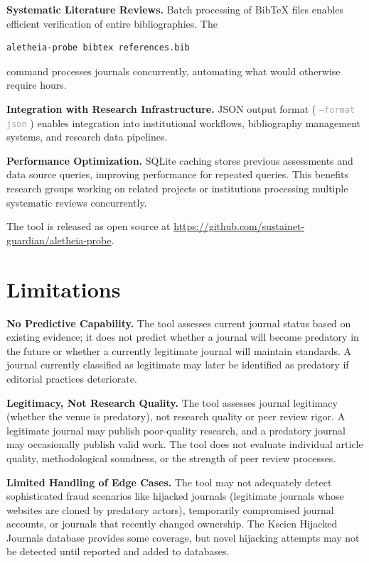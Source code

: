 \documentclass[fleqn,10pt]{SelfArx}
\newcommand{\ilcode}[1]{%
  \texttt{\small\textcolor{darkgray}{#1}}%
}
\begin{document}
\textbf{Systematic Literature Reviews.} Batch processing of BibTeX
files enables efficient verification of entire bibliographies. The
\begin{lstlisting}[language=bash,basicstyle=\ttfamily\scriptsize]
aletheia-probe bibtex references.bib
\end{lstlisting}
command processes journals concurrently, automating what
would otherwise require hours.

\textbf{Integration with Research Infrastructure.} JSON output format
(\ilcode{--format json}) enables integration into institutional
workflows, bibliography management systems, and research data
pipelines.

\textbf{Performance Optimization.} SQLite caching stores previous
assessments and data source queries, improving performance for repeated
queries. This benefits research groups working on related projects or
institutions processing multiple systematic reviews concurrently.

The tool is released as open source at
\url{https://github.com/sustainet-guardian/aletheia-probe}.

\section{Limitations}

\textbf{No Predictive Capability.} The tool assesses current journal
status based on existing evidence; it does not predict whether a
journal will become predatory in the future or whether a currently
legitimate journal will maintain standards. A journal currently
classified as legitimate may later be identified as predatory if
editorial practices deteriorate.

\textbf{Legitimacy, Not Research Quality.} The tool assesses journal
legitimacy (whether the venue is predatory), not research quality or
peer review rigor. A legitimate journal may publish poor-quality
research, and a predatory journal may occasionally publish valid work.
The tool does not evaluate individual article quality, methodological
soundness, or the strength of peer review processes.

\textbf{Limited Handling of Edge Cases.} The tool may not adequately
detect sophisticated fraud scenarios like hijacked journals (legitimate
journals whose websites are cloned by predatory actors), temporarily
compromised journal accounts, or journals that recently changed
ownership. The Kscien Hijacked Journals database provides some
coverage, but novel hijacking attempts may not be detected until
reported and added to databases.
\end{document}
